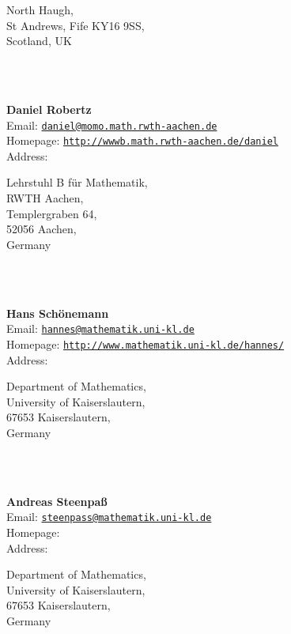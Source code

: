 \documentclass[a4paper,11pt]{report}
\begin{document}
\begin{titlepage}
{\begin{minipage}[t]{8cm}
 North Haugh, \\
 St Andrews, Fife KY16 9SS, \\
 Scotland, UK \end{minipage}
}\\
{\mbox{}\\
\small \noindent \textbf{Daniel Robertz\\
    }  Email: \href{mailto://daniel@momo.math.rwth-aachen.de} {\texttt{daniel@momo.math.rwth-aachen.de}}\\
  Homepage: \href{http://wwwb.math.rwth-aachen.de/~daniel} {\texttt{http://wwwb.math.rwth-aachen.de/\texttt{}daniel}}\\
  Address: \begin{minipage}[t]{8cm}\noindent
 Lehrstuhl B f{\"u}r Mathematik, \\
 RWTH Aachen, \\
 Templergraben 64, \\
 52056 Aachen, \\
 Germany \end{minipage}
}\\
{\mbox{}\\
\small \noindent \textbf{Hans Sch{\"o}nemann\\
    }  Email: \href{mailto://hannes@mathematik.uni-kl.de} {\texttt{hannes@mathematik.uni-kl.de}}\\
  Homepage: \href{http://www.mathematik.uni-kl.de/~hannes/} {\texttt{http://www.mathematik.uni-kl.de/\texttt{}hannes/}}\\
  Address: \begin{minipage}[t]{8cm}\noindent
 Department of Mathematics, \\
 University of Kaiserslautern, \\
 67653 Kaiserslautern, \\
 Germany \end{minipage}
}\\
{\mbox{}\\
\small \noindent \textbf{Andreas Steenpa{\ss}\\
    }  Email: \href{mailto://steenpass@mathematik.uni-kl.de} {\texttt{steenpass@mathematik.uni-kl.de}}\\
  Homepage: \href{} {\texttt{}}\\
  Address: \begin{minipage}[t]{8cm}\noindent
 Department of Mathematics, \\
 University of Kaiserslautern, \\
 67653 Kaiserslautern, \\
 Germany \end{minipage}
}\\
\end{titlepage}
\end{document}

